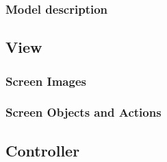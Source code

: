 \subsubsection{Model description}

\subsection{View} %

\subsubsection{Screen Images} %

\subsubsection{Screen Objects and Actions} %



\subsection{Controller} %

